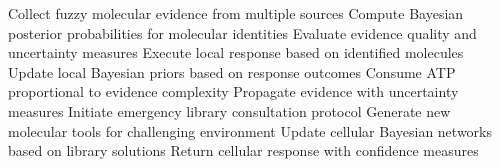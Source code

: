 \documentclass[12pt,a4paper]{article}
\begin{document}
\begin{algorithm}
\caption{Hierarchical Cellular Evidence Processing}
\begin{algorithmic}
    \State Collect fuzzy molecular evidence from multiple sources
    \State Compute Bayesian posterior probabilities for molecular identities
    \State Evaluate evidence quality and uncertainty measures
        \State Execute local response based on identified molecules
        \State Update local Bayesian priors based on response outcomes
        \State Consume ATP proportional to evidence complexity
    \Else
            \State Propagate evidence with uncertainty measures
            \State {}
        \EndFor
            \State Initiate emergency library consultation protocol
            \State Generate new molecular tools for challenging environment
            \State Update cellular Bayesian networks based on library solutions
        \EndIf
    \EndIf
    \State Return cellular response with confidence measures
\EndProcedure
\end{algorithmic}
\end{algorithm}
\end{document}
